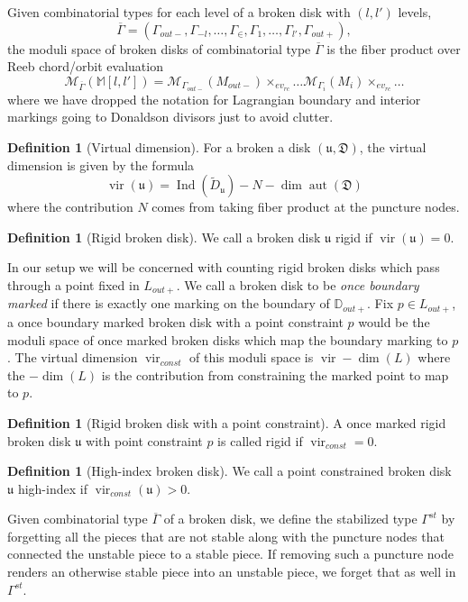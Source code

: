 \documentclass[11pt, oneside,dvipsnames]{amsart}
\newcommand{\wt}{\widetilde}
\newcommand{\<}{\langle}
\renewcommand{\>}{\rangle}
\newcommand{\outp}{{out+}}
\newcommand{\outm}{{out-}}
\DeclareMathOperator{\Ind}{Ind}
\DeclareMathOperator{\vir}{vir}
\DeclareMathOperator{\aut}{aut}
\newcommand{\bD}{\mathbb{D}}
\newcommand{\bM}{\mathbb{M}}
\newcommand{\cM}{\mathcal{M}}
\theoremstyle{definition}
\theoremstyle{definition}
\newtheorem{defn}[Theorem]{Definition}
\numberwithin{equation}{subsection}
\begin{document}
\noindent Given combinatorial types for each level of a broken disk with $(l,l')$ levels, $$ \overline{\Gamma}=(\Gamma_\outm,\Gamma_{-l},\dots,\Gamma_\in,\Gamma_1,\dots,\Gamma_{l'},\Gamma_\outp),$$ the moduli space of broken disks of combinatorial type $\overline{\Gamma}$ is the fiber product over Reeb chord/orbit evaluation $$\cM_{\overline{\Gamma}}(\bM[l,l']) = \cM_{\Gamma_\outm}(M_\outm)\times_{ev_{rc}}\dots \cM_{\Gamma_i}(M_i) \times_{ev_{rc}} \dots  $$
where we have dropped the notation for Lagrangian boundary and interior markings going to Donaldson divisors just to avoid clutter.
\begin{defn}[Virtual dimension]
For a broken a disk $(\mathfrak{u,D})$, the virtual dimension is given by the formula $$\vir (\mathfrak{u}) = \Ind(\wt D_\mathfrak{u}) - N - \dim \aut(\mathfrak{D})$$ where the contribution $N$ comes from taking fiber product at the puncture nodes.
\end{defn}


\begin{defn}[Rigid broken disk]
We call a broken disk $\mathfrak{u}$ rigid if $\vir(\mathfrak{u}) = 0$. 
\end{defn}

In our setup we will be concerned with counting rigid broken disks which pass through a point fixed in $L_\outp.$ We call a broken disk to be \textit{once boundary marked} if there is exactly one marking on the boundary of $\bD_\outp.$ Fix $p\in L_\outp$, a once boundary marked broken disk with a point constraint $p$ would be the moduli space of once marked broken disks which map the boundary marking to $p$. The virtual dimension $\vir_{const}$ of this moduli space is $\vir - \dim(L)$ where the $-\dim(L)$ is the contribution from constraining the marked point to map to $p$.
\begin{defn}[Rigid broken disk with a point constraint]
    A once marked rigid broken disk $\mathfrak{u}$ with point constraint $p$ is called rigid if $\vir_{const} = 0.$
\end{defn}

\begin{defn}[High-index broken disk]
We call a point constrained broken disk $\mathfrak{u}$ high-index if $\vir_{const}(\mathfrak{u}) > 0$.

\end{defn}


Given combinatorial type $\overline{\Gamma}$ of a broken disk, we define the stabilized type $\Gamma^{st}$ by forgetting all the pieces that are not stable along with the puncture nodes that connected the unstable piece to a stable piece. If removing such a puncture node renders an otherwise stable piece into an unstable piece, we forget that as well in $\Gamma^{st}$. 
\end{document}
